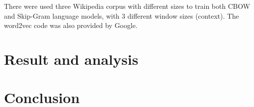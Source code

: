\documentclass[12pt]{article}
\begin{document}
\hspace{6ex} There were used three Wikipedia corpus with different sizes to train both CBOW and Skip-Gram language models, with 3 different window sizes (context). The word2vec code was also provided by Google.

\section{Result and analysis}

\section{Conclusion}









\end{document}
